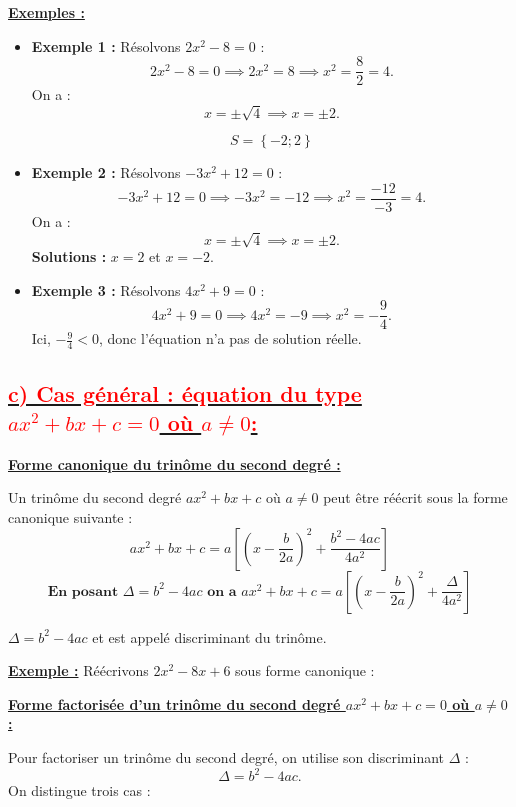 \documentclass[12pt]{article}
\newcounter{solution}
\begin{document}
\textbf{\underline{Exemples :}}

\begin{itemize}
    \item \textbf{Exemple 1 :} Résolvons \( 2x^2 - 8 = 0 \) :  
    \[
    2x^2 - 8 = 0 \implies 2x^2 = 8 \implies x^2 = \frac{8}{2} = 4.
    \]
    On a :
    \[
    x = \pm \sqrt{4} \implies x = \pm 2.
    \]
    
    \[
    S=\left\lbrace - 2 ; 2 \right\rbrace 
    \]

    \item \textbf{Exemple 2 :} Résolvons \( -3x^2 + 12 = 0 \) :  
    \[
    -3x^2 + 12 = 0 \implies -3x^2 = -12 \implies x^2 = \frac{-12}{-3} = 4.
    \]
    On a :
    \[
    x = \pm \sqrt{4} \implies x = \pm 2.
    \]
    \textbf{Solutions :} \( x = 2 \) et \( x = -2 \).

    \item \textbf{Exemple 3 :} Résolvons \( 4x^2 + 9 = 0 \) :  
    \[
    4x^2 + 9 = 0 \implies 4x^2 = -9 \implies x^2 = -\frac{9}{4}.
    \]
    Ici, \( -\frac{9}{4} < 0 \), donc l'équation n'a pas de solution réelle.
\end{itemize}

\subsection*{\underline{\textbf{\textcolor{red}{c) Cas général : équation du type \( ax^2 + bx + c = 0 \) où \( a \neq 0 \):}}}}

\textbf{\underline{Forme canonique du trinôme du second degré :}}  

Un trinôme du second degré \( ax^2 + bx + c \) où \( a \neq 0 \) peut être réécrit sous la forme canonique suivante :  
\[
ax^2 + bx + c = a\left[ \left( x - \frac{b}{2a} \right)^2 + \frac{b^2-4ac}{4a^{2}} \right] 
\]
\[ \textbf{En posant } \Delta = b^2-4ac \textbf{ on a } 
ax^2 + bx + c = a\left[ \left( x - \frac{b}{2a} \right)^2 + \frac{\Delta}{4a^{2}} \right] 
\]

$\Delta = b^2-4ac$ et est appelé discriminant du
trinôme. 

\textbf{\underline{Exemple :}}  
Réécrivons \( 2x^2 - 8x + 6 \) sous forme canonique :

\textbf{\underline{Forme factorisée d’un trinôme du second degré \( ax^2 + bx + c = 0 \) où \( a \neq 0 \):}}  

Pour factoriser un trinôme du second degré, on utilise son discriminant \( \Delta \) :
\[
\Delta = b^2 - 4ac.
\]
On distingue trois cas :
\end{document}
